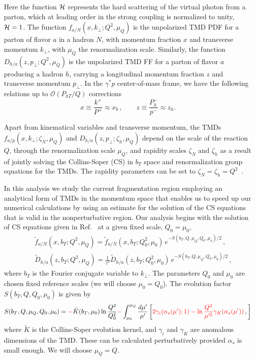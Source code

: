 \documentclass[final,3p,times,onecolumn,sort&compress,hidelinks]{elsarticle}
\newcommand{\xbj}{x_b}
\newcommand{\crd}{\color{red}}
\begin{document}
%
Here the function ${\cal H}$ represents the hard scattering of the
virtual photon from a parton, which at leading order in the strong
coupling is normalized to unity, ${\cal H} = 1$.
The function $f_{a/N}(x, k_\perp; Q^2, \mu_Q)$ is the unpolarized
TMD PDF for a parton of flavor $a$ in a hadron $N$, with momentum
fraction $x$ and transverse momentum $k_\perp$, with $\mu_Q$ the
renormalization scale.
Similarly, the function $D_{h/a}(z, p_\perp; Q^2, \mu_Q)$ is the
unpolarized TMD FF for a parton of flavor $a$ producing a hadron $h$,
carrying a longitudinal momentum fraction $z$ and transverse momentum
$p_\perp$.
%
In the $\gamma^* p$ center-of-mass frame, we have the following
relations up to $\mathcal{O}(P_{hT}/Q)$
corrections~\cite{Bacchetta:2006tn}
%
\begin{equation}
x \equiv \frac{k^+}{P^+}\approx \xbj\,,
  \quad\quad
z \equiv \frac{P_h^-}{p^-}\approx z_h.
  \label{e:LT_relations}
\end{equation}


Apart from kinematical variables and transverse momentum, the TMDs
$f_{a/p}(x, k_\perp; \zeta_N, \mu_Q)$ and
$D_{h/a}(z, p_\perp; \zeta_h, \mu_Q)$ depend on the scale of the
reaction $Q$, through the renormalization scale $\mu_Q$, and
rapidity scales $\zeta_N$ and $\zeta_h$ as a result of jointly
solving the Collins-Soper (CS) in $b_T$ space and renormalization
group equations for the TMDs.  The rapidity parameters can be set to 
$\zeta_N = \zeta_h = Q^2$~\cite{Collins:2011zzd, Collins:2014jpa}.


In this analysis we study the current fragmentation region employing
an analytical form of TMDs in the momentum space that enables us to
speed up our numerical calculations by using an estimate for the
solution of the CS equations that is valid in the nonperturbative
region. Our analysis begins with the solution of CS equations given
in Ref.~\cite{Collins:2014jpa} at a given fixed scale, $Q_0=\mu_0$,
%
\begin{eqnarray}
&&\tilde f_{a/N} (x,b_T; Q^2, \mu_Q)= \tilde f_{a/N} (x, b_T; Q_0^2, \mu_0)\,e^{-S(b_T, Q, \mu_Q, Q_0, \mu_0)/2}\,,
\label{e:PDF_ansatz}\\[0.3cm]
&&\tilde D_{h/a}(z,b_T; Q^2, \mu_Q)=\frac{1}{z^2}\tilde D_{h/a}(z, b_T; Q_0^2, \mu_0)\,e^{-S(b_T, Q, \mu_Q, Q_0, \mu_0)/2}\,,
\label{e:FF_ansatz0}
\end{eqnarray}
%
where $b_T$ is the Fourier conjugate variable to $k_\perp$.
The parameters $Q_0$ and $\mu_0$ are chosen fixed reference scales
(we will choose $\mu_0 = Q_0$).
The evolution factor $S(b_T, Q, Q_0, \mu_0)$ is given by
%
\begin{eqnarray}
S(b_T, Q, \mu_Q, Q_0, \mu_0) = {\crd -}\tilde K(b_T,\mu_0) \ln\frac{Q^2}{Q_0^2} {\crd -} \int_{\mu_0}^{\mu_Q} \frac{d \mu'}{\mu'}\left[
{\crd 2 \gamma_i(\alpha_s(\mu');1) -\ln\frac{Q^2}{\mu'^2}\gamma_K(\alpha_s(\mu'))}\,,
 \right]
 \label{e:FF_ansatz}
\end{eqnarray}
%
where $\tilde K$ is the Collins-Soper evolution kernel, and $\gamma_i$
and $\gamma_K$ are anomalous dimensions of the TMD.  These can be
calculated perturbatively provided $\alpha_s$ is small enough. We will
choose $\mu_Q = Q$.
\end{document}
